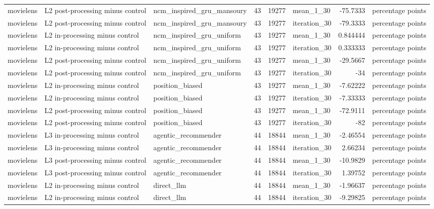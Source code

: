 \begin{table}[htbp!]
\begin{tabular}{lllrrlrl}
movielens & L2 post-processing minus control & ncm\_inspired\_gru\_mansoury & 43 & 19277 & mean\_1\_30 & -75.7333 & percentage points \\
movielens & L2 post-processing minus control & ncm\_inspired\_gru\_mansoury & 43 & 19277 & iteration\_30 & -79.3333 & percentage points \\
movielens & L2 in-processing minus control & ncm\_inspired\_gru\_uniform & 43 & 19277 & mean\_1\_30 & 0.844444 & percentage points \\
movielens & L2 in-processing minus control & ncm\_inspired\_gru\_uniform & 43 & 19277 & iteration\_30 & 0.333333 & percentage points \\
movielens & L2 post-processing minus control & ncm\_inspired\_gru\_uniform & 43 & 19277 & mean\_1\_30 & -29.5667 & percentage points \\
movielens & L2 post-processing minus control & ncm\_inspired\_gru\_uniform & 43 & 19277 & iteration\_30 & -34 & percentage points \\
movielens & L2 in-processing minus control & position\_biased & 43 & 19277 & mean\_1\_30 & -7.62222 & percentage points \\
movielens & L2 in-processing minus control & position\_biased & 43 & 19277 & iteration\_30 & -7.33333 & percentage points \\
movielens & L2 post-processing minus control & position\_biased & 43 & 19277 & mean\_1\_30 & -72.9111 & percentage points \\
movielens & L2 post-processing minus control & position\_biased & 43 & 19277 & iteration\_30 & -82 & percentage points \\
movielens & L3 in-processing minus control & agentic\_recommender & 44 & 18844 & mean\_1\_30 & -2.46554 & percentage points \\
movielens & L3 in-processing minus control & agentic\_recommender & 44 & 18844 & iteration\_30 & 2.66234 & percentage points \\
movielens & L3 post-processing minus control & agentic\_recommender & 44 & 18844 & mean\_1\_30 & -10.9829 & percentage points \\
movielens & L3 post-processing minus control & agentic\_recommender & 44 & 18844 & iteration\_30 & 1.39752 & percentage points \\
movielens & L2 in-processing minus control & direct\_llm & 44 & 18844 & mean\_1\_30 & -1.96637 & percentage points \\
movielens & L2 in-processing minus control & direct\_llm & 44 & 18844 & iteration\_30 & -9.29825 & percentage points \\

\end{tabular}
\end{table}
